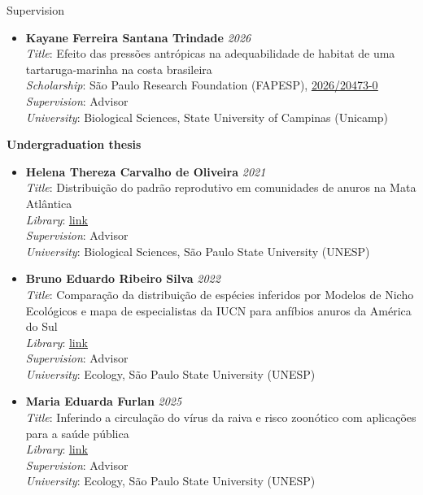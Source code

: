 \documentclass{resume}
\begin{document}
\begin{rSection}{Supervision}
\begin{itemize}
\item \textbf{Kayane Ferreira Santana Trindade} \hfill{\em 2026}\\
\textit{Title}: Efeito das pressões antrópicas na adequabilidade de habitat de uma tartaruga-marinha na costa brasileira\\
\textit{Scholarship}: São Paulo Research Foundation (FAPESP), \href{https://bv.fapesp.br/pt/bolsas/245887/efeito-das-pressoes-antropicas-na-adequabilidade-de-habitat-de-uma-tartaruga-marinha-na-costa-brasil/}{\underline{2026/20473-0}}\\ 
\textit{Supervision}: Advisor\\
\textit{University}: Biological Sciences, State University of Campinas (Unicamp)
\end{itemize}

\textbf{Undergraduation thesis}
\begin{itemize}
\item \textbf{Helena Thereza Carvalho de Oliveira} \hfill{\em 2021}\\
\textit{Title}: Distribuição do padrão reprodutivo em comunidades de anuros na Mata Atlântica\\
\textit{Library}: \href{http://hdl.handle.net/11449/214578}{\underline{link}}\\
\textit{Supervision}: Advisor\\
\textit{University}: Biological Sciences, São Paulo State University (UNESP)

\item \textbf{Bruno Eduardo Ribeiro Silva} \hfill{\em 2022}\\
\textit{Title}: Comparação da distribuição de espécies inferidos por Modelos de Nicho Ecológicos e mapa de especialistas da IUCN para anfíbios anuros da América do Sul\\
\textit{Library}: \href{http://hdl.handle.net/11449/238308}{\underline{link}}\\
\textit{Supervision}: Advisor\\
\textit{University}: Ecology, São Paulo State University (UNESP)

\item \textbf{Maria Eduarda Furlan} \hfill{\em 2025}\\
\textit{Title}: Inferindo a circulação do vírus da raiva e risco zoonótico com aplicações para a saúde pública\\
\textit{Library}: \href{https://hdl.handle.net/11449/315346}{\underline{link}}\\
\textit{Supervision}: Advisor\\
\textit{University}: Ecology, São Paulo State University (UNESP)


\end{itemize}
\end{rSection}
\end{document}
